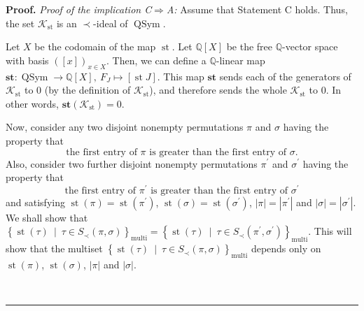 \documentclass[numbers=enddot,12pt,final,onecolumn,notitlepage]{scrartcl}%
\theoremstyle{definition}
\newenvironment{proof}[1][Proof]{\noindent\textbf{#1.} }{\ \rule{0.5em}{0.5em}}
\begin{document}
\begin{proof}
\textit{Proof of the implication C}$\Longrightarrow$\textit{A:} Assume that
Statement C holds. Thus, the set $\mathcal{K}_{\operatorname*{st}}$ is an
$\left.  \prec\right.  $-ideal of $\operatorname*{QSym}$.

Let $X$ be the codomain of the map $\operatorname*{st}$. Let $\mathbb{Q}%
\left[  X\right]  $ be the free $\mathbb{Q}$-vector space with basis $\left(
\left[  x\right]  \right)  _{x\in X}$. Then, we can define a $\mathbb{Q}%
$-linear map $\mathbf{st}:\operatorname*{QSym}\rightarrow\mathbb{Q}\left[
X\right]  ,\ F_{J}\mapsto\left[  \operatorname*{st}J\right]  $. This map
$\mathbf{st}$ sends each of the generators of $\mathcal{K}_{\operatorname*{st}%
}$ to $0$ (by the definition of $\mathcal{K}_{\operatorname*{st}}$), and
therefore sends the whole $\mathcal{K}_{\operatorname*{st}}$ to $0$. In other
words, $\mathbf{st}\left(  \mathcal{K}_{\operatorname*{st}}\right)  =0$.

Now, consider any two disjoint nonempty permutations $\pi$ and $\sigma$ having
the property that%
\[
\text{the first entry of }\pi\text{ is greater than the first entry of }%
\sigma.
\]
Also, consider two further disjoint nonempty permutations $\pi^{\prime}$ and
$\sigma^{\prime}$ having the property that
\[
\text{the first entry of }\pi^{\prime}\text{ is greater than the first entry
of }\sigma^{\prime}%
\]
and satisfying $\operatorname*{st}\left(  \pi\right)  =\operatorname*{st}%
\left(  \pi^{\prime}\right)  $, $\operatorname*{st}\left(  \sigma\right)
=\operatorname*{st}\left(  \sigma^{\prime}\right)  $, $\left\vert
\pi\right\vert =\left\vert \pi^{\prime}\right\vert $ and $\left\vert
\sigma\right\vert =\left\vert \sigma^{\prime}\right\vert $. We shall show that
$\left\{  \operatorname*{st}\left(  \tau\right)  \ \mid\ \tau\in S_{\prec
}\left(  \pi,\sigma\right)  \right\}  _{\operatorname*{multi}} =\left\{
\operatorname*{st}\left(  \tau\right)  \ \mid\ \tau\in S_{\prec}\left(
\pi^{\prime},\sigma^{\prime}\right)  \right\}  _{\operatorname*{multi}}$. This
will show that the multiset $\left\{  \operatorname*{st}\left(  \tau\right)
\ \mid\ \tau\in S_{\prec}\left(  \pi,\sigma\right)  \right\}
_{\operatorname*{multi}} $ depends only on $\operatorname*{st}\left(
\pi\right)  $, $\operatorname*{st}\left(  \sigma\right)  $, $\left\vert
\pi\right\vert $ and $\left\vert \sigma\right\vert $.


\end{proof}
\end{document}
